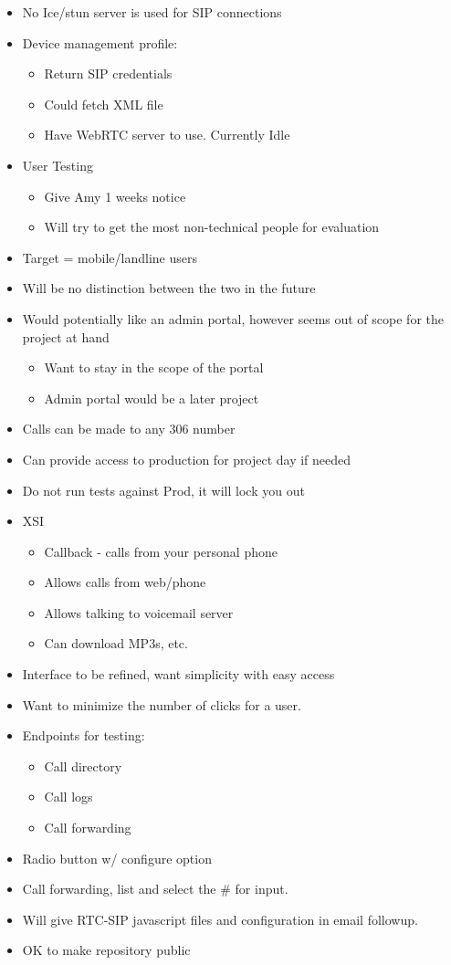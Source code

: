 \documentclass[12pt]{article}
\begin{document}
\begin{itemize}
	\item No Ice/stun server is used for SIP connections
	\item Device management profile:
	\begin{itemize}
		\item Return SIP credentials
		\item Could fetch XML file
		\item Have WebRTC server to use. Currently Idle
	\end{itemize}
	\item User Testing
	\begin{itemize}
		\item Give Amy 1 weeks notice
		\item Will try to get the most non-technical people for evaluation
	\end{itemize}
	\item Target = mobile/landline users
	\item Will be no distinction between the two in the future
	\item Would potentially like an admin portal, however seems out of scope for the project at hand
	\begin{itemize}
		\item Want to stay in the scope of the portal
		\item Admin portal would be a later project
	\end{itemize}
	\item Calls can be made to any 306 number
	\item Can provide access to production for project day if needed
	\item Do not run tests against Prod, it will lock you out
	\item XSI
	\begin{itemize}
		\item Callback - calls from your personal phone
		\item Allows calls from web/phone
		\item Allows talking to voicemail server
		\item Can download MP3s, etc.
	\end{itemize}
	\item Interface to be refined, want simplicity with easy access
	\item Want to minimize the number of clicks for a user.
	\item Endpoints for testing:
	\begin{itemize}
		\item Call directory
		\item Call logs
		\item Call forwarding
	\end{itemize}
	\item Radio button w/ configure option
	\item Call forwarding, list and select the \# for input.
	\item Will give RTC-SIP javascript files and configuration in email followup.
	\item OK to make repository public
\end{itemize}
\end{document}

